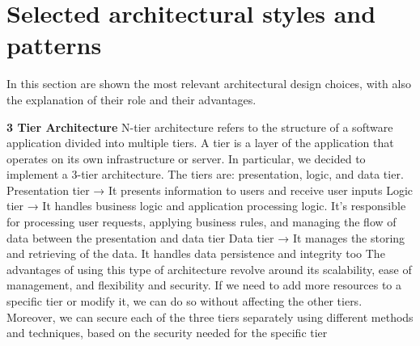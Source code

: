 \section{Selected architectural styles and patterns}

In this section are shown the most relevant architectural design choices, with also the explanation of their role and their advantages.

\textbf{3 Tier Architecture}\newline
N-tier architecture refers to the structure of a software application divided into multiple tiers. 
A tier is a layer of the application that operates on its own infrastructure or server. 
In particular, we decided to implement a 3-tier architecture. The tiers are: presentation, logic, and data tier.\newline
Presentation tier → It presents information to users and receive user inputs\newline
Logic tier → It handles business logic and application processing logic. It’s responsible for processing user requests, 
applying business rules, and managing the flow of data between the presentation and data tier\newline
Data tier → It manages the storing and retrieving of the data. It handles data persistence and integrity too\newline
The advantages of using this type of architecture revolve around its scalability, ease of management, and flexibility and security. 
If we need to add more resources to a specific tier or modify it, we can do so without affecting the other tiers. Moreover, we can secure each 
of the three tiers separately using different methods and techniques, based on the security needed for the specific tier

